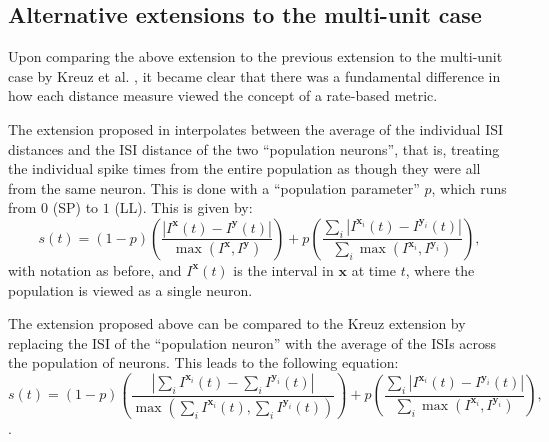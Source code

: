 \subsection{Alternative extensions to the multi-unit case}

Upon comparing the above extension to the previous extension to the multi-unit case by Kreuz et al. \cite{Kreuzetal2009}, it became clear that there was a fundamental difference in how each distance measure viewed the concept of a rate-based metric.


The extension proposed in \cite{Kreuzetal2009} interpolates between the average of the individual ISI distances and the ISI distance of the two ``population neurons'', that is, treating the individual spike times from the entire population as though they were all from the same neuron.  This is done with a ``population parameter'' $p$, which runs from $0$ (SP) to $1$ (LL).  This is given by:
\begin{equation}
\label{pop}
s(t) = (1-p)\left( \frac{ | I^{\mathbf{x}}(t) - I^{\mathbf{y}}(t) |}{ \max (I^{\mathbf{x}},I^{\mathbf{y}})}\right) + p\left( \frac{\sum_i | I^{\mathbf{x}_i}(t) - I^{\mathbf{y}_i}(t) |}{\sum_i \max (I^{\mathbf{x}_i},I^{\mathbf{y}_i})} \right),
\end{equation}
with notation as before, and $I^{\mathbf{x}}(t)$ is the interval in $\mathbf{x}$ at time $t$, where the population is viewed as a single neuron.

%

The extension proposed above can be compared to the Kreuz extension by replacing the ISI of the ``population neuron'' with the average of the ISIs across the population of neurons.  This leads to the following equation: 
\begin{equation}
\label{av}
s(t) = (1-p) \left(\frac{ | \sum_i I^{\mathbf{x}_i}(t) - \sum_i I^{\mathbf{y}_i}(t) |}{\max (\sum_i I^{\mathbf{x}_i}(t),\sum_i I^{\mathbf{y}_i}(t) )}\right) + p\left( \frac{\sum_i | I^{\mathbf{x}_i}(t) - I^{\mathbf{y}_i}(t) |}{\sum_i \max (I^{\mathbf{x}_i},I^{\mathbf{y}_i})} \right),
\end{equation}.


